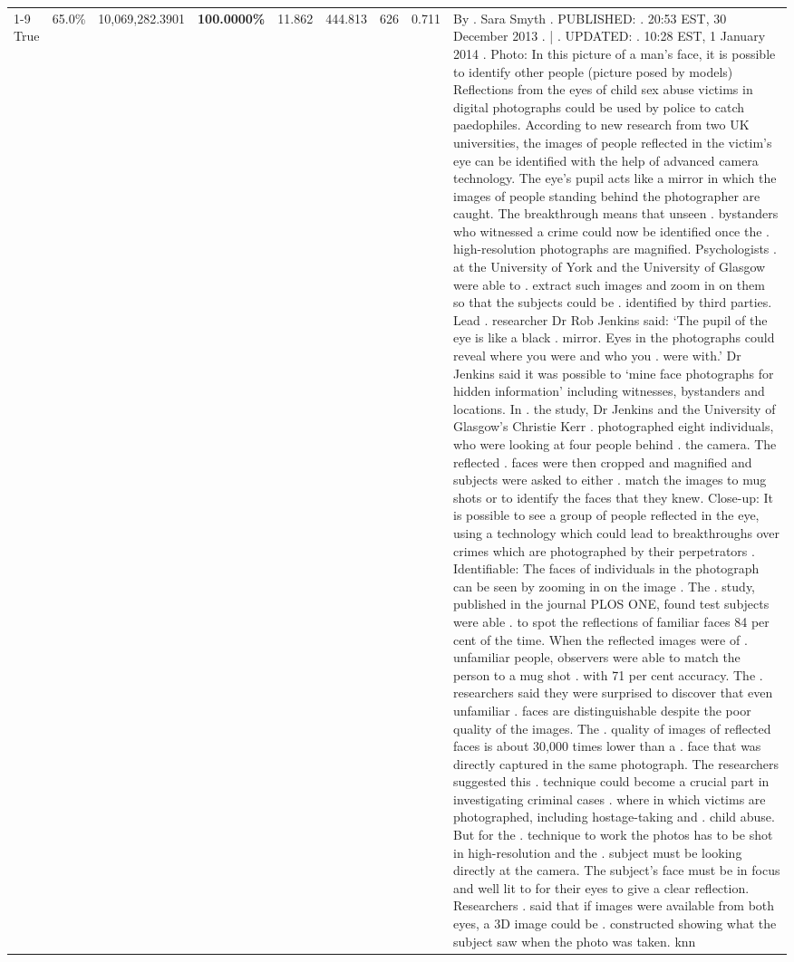 \begin{table}[H]
\begin{tabular}{lllrlllll}
\cline{1-9}
True & 65.0\% & 10,069,282.3901 & \bfseries \color{red} 100.0000\% & 11.862 & 444.813 & 626 & 0.711 & By . Sara Smyth . PUBLISHED: . 20:53 EST, 30 December 2013 . | . UPDATED: . 10:28 EST, 1 January 2014 . Photo: In this picture of a man's face, it is possible to identify other people (picture posed by models) Reflections from the eyes of child sex abuse victims in digital photographs could be used by police to catch paedophiles. According to new research from two UK universities, the images of people reflected in the victim's eye can be identified with the help of advanced camera technology. The eye's pupil acts like a mirror in which the images of people standing behind the photographer are caught. The breakthrough means that unseen . bystanders who witnessed a crime could now be identified once the . high-resolution photographs are magnified. Psychologists . at the University of York and the University of Glasgow were able to . extract such images and zoom in on them so that the subjects could be . identified by third parties. Lead . researcher Dr Rob Jenkins said: ‘The pupil of the eye is like a black . mirror. Eyes in the photographs could reveal where you were and who you . were with.' Dr Jenkins said it was possible to ‘mine face photographs for hidden information' including witnesses, bystanders and locations. In . the study, Dr Jenkins and the University of Glasgow's Christie Kerr . photographed eight individuals, who were looking at four people behind . the camera. The reflected . faces were then cropped and magnified and subjects were asked to either . match the images to mug shots or to identify the faces that they knew. Close-up: It is possible to see a group of people reflected in the eye, using a technology which could lead to breakthroughs over crimes which are photographed by their perpetrators . Identifiable: The faces of individuals in the photograph can be seen by zooming in on the image . The . study, published in the journal PLOS ONE, found test subjects were able . to spot the reflections of familiar faces 84 per cent of the time. When the reflected images were of . unfamiliar people, observers were able to match the person to a mug shot . with 71 per cent accuracy. The . researchers said they were surprised to discover that even unfamiliar . faces are distinguishable despite the poor quality of the images. The . quality of images of reflected faces is about 30,000 times lower than a . face that was directly captured in the same photograph. The researchers suggested this . technique could become a crucial part in investigating criminal cases . where in which victims are photographed, including hostage-taking and . child abuse. But for the . technique to work the photos has to be shot in high-resolution and the . subject must be looking directly at the camera. The subject's face must be in focus and well lit to for their eyes to give a clear reflection. Researchers . said that if images were available from both eyes, a 3D image could be . constructed showing what the subject saw when the photo was taken. knn \\

\end{tabular}
\end{table}
